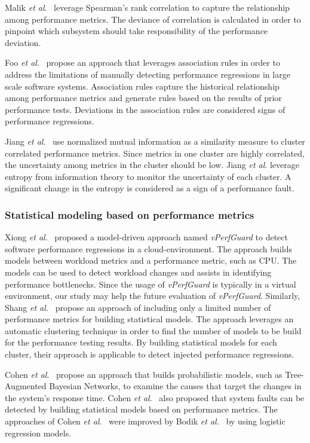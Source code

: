 \documentclass[smallextended]{svjour3}       %
\begin{document}
Malik \emph{et al$.$}~\cite{5635038} leverage Spearman's rank correlation to capture the relationship among performance metrics. The deviance of correlation is calculated in order to pinpoint which subsystem should take responsibility of the performance deviation.

Foo\emph{ et al$.$}~\cite{foo2010mining} propose an approach that leverages association rules in order to address the limitations of manually detecting performance regressions in large scale software systems. Association rules capture the historical relationship among performance metrics and generate rules based on the results of prior performance tests. Deviations in the association rules are considered signs of performance regressions.

Jiang \emph{et al$.$}~\cite{5270324} use normalized mutual information as a similarity measure to cluster correlated performance metrics. Since metrics in one cluster are highly correlated, the uncertainty among metrics in the cluster should be low. Jiang \emph{et al$.$} leverage entropy from information theory to monitor the uncertainty of each cluster. A significant change in the entropy is considered as a sign of a performance fault. 


\subsubsection{Statistical modeling based on performance metrics}
\label{sec:relatedmodel}

Xiong \textit{et al$.$}~\cite{xiong2013vperfguard} proposed a model-driven approach named \textit{vPerfGuard} to detect software performance regressions in a cloud-environment. The approach builds models between workload metrics and a performance metric, such as CPU. The models can be used to detect workload changes and assists in identifying performance bottlenecks. Since the usage of \emph{vPerfGuard} is typically in a virtual environment, our study may help the future evaluation of \textit{vPerfGuard}. Similarly, Shang\textit{ et al.}~\cite{Shang:2015:ADP:2668930.2688052} propose an approach of including only a limited number of performance metrics for building statistical models. The approach leverages an automatic clustering technique in order to find the number of models to be build for the performance testing results. By building statistical models for each cluster, their approach is applicable to detect injected performance regressions. 

Cohen \textit{et al$.$}~\cite{cohen2004correlating} propose an approach that builds probabilistic models, such as Tree-Augmented Bayesian Networks, to examine the causes that target the changes in the system's response time. Cohen \textit{et al$.$}~\cite{Cohen:2005:CIC:1095810.1095821} also proposed that system faults can be detected by building statistical models based on performance metrics. The approaches of Cohen \textit{et al$.$}~\cite{cohen2004correlating, Cohen:2005:CIC:1095810.1095821} were improved by Bodik \textit{et al.}~\cite{bodik2008hilighter} by using logistic regression models.
\end{document}

